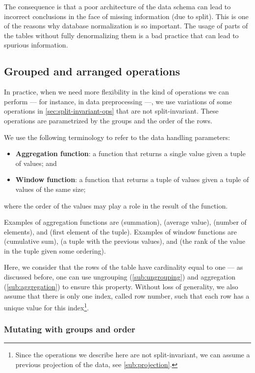 The consequence is that a poor architecture of the data schema can lead to
incorrect conclusions in the face of missing information (due to split).  This is one of
the reasons why database normalization is so important.  The usage of parts of the tables
without fully denormalizing them is a bad practice that can lead to spurious information.

\subsection{Grouped and arranged operations}
\label{sub:grouped-arranged}

In practice, when we need more flexibility in the kind of operations we can perform ---
for instance, in data preprocessing ---, we use variations of some operations in
\cref{sec:split-invariant-ops} that are not split-invariant.  These operations are
parametrized by the groups and the order of the rows.

We use the following terminology to refer to the data handling parameters:
\begin{itemize}
  \itemsep0em
  \item \textbf{Aggregation function}: a function that returns a single value given a
    tuple of values; and
  \item \textbf{Window function}: a function that returns a tuple of values given a tuple
    of values of the same size;
\end{itemize}
where the order of the values may play a role in the result of the function.

Examples of aggregation functions are  (summation),  (average value),
 (number of elements), and  (first element of the tuple). Examples
of window functions are  (cumulative sum),  (a tuple with the
previous values), and  (the rank of the value in the tuple given some
ordering).

Here, we consider that the rows of the table have cardinality equal to one --- as
discussed before, one can use ungrouping (\cref{sub:ungrouping}) and aggregation
(\cref{sub:aggregation}) to ensure this property.  Without loss of generality, we also
assume that there is only one index, called row number, such that each row has a unique
value for this index\footnote{Since the operations we describe here are not
split-invariant, we can assume a previous projection of the data, see
\cref{sub:projection}.}.

\subsubsection{Mutating with groups and order}

